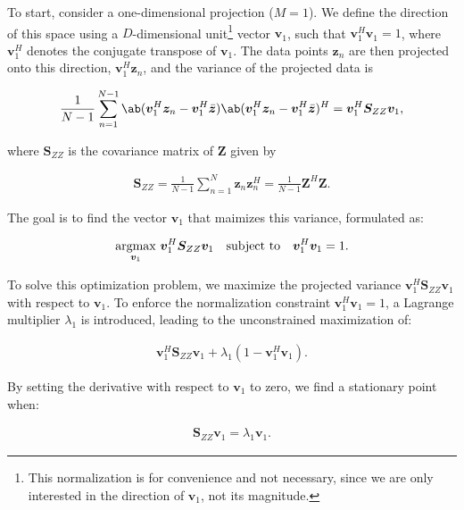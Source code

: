 To start, consider a one-dimensional projection ($M=1$). We define the direction of this space using a $D$-dimensional unit\footnote{This normalization is for convenience and not necessary, since we are only interested in the direction of $\bm{v}_1$, not its magnitude.} vector $\bm{v}_1$, such that $\bm{v}_1^H\bm{v}_1=1$, where $\bm{v}_1^H$ denotes the conjugate transpose of $\bm{v}_1$. The data points $\bm{z}_n$ are then projected onto this direction, $\bm{v}_1^H\bm{z}_n$, and the variance of the projected data is 

\begin{align}
    \frac{1}{N-1} \sum_{n=1}^{N-1} \ab( \bm{v}_1^H\bm{z}_n - \bm{v}_1^H\bar{\bm{z}} ) \ab( \bm{v}_1^H\bm{z}_n - \bm{v}_1^H\bar{\bm{z}} )^H = \bm{v}_1^H\bm{S}_{ZZ}\bm{v}_1,
\end{align}

where $\bm{S}_{ZZ}$ is the covariance matrix of $\bm{Z}$ given by

\begin{align}
    \bm{S}_{ZZ} = \frac{1}{N-1} \sum_{n=1}^{N} \bm{z}_n \bm{z}_n^H = \frac{1}{N-1} \bm{Z}^H \bm{Z}.
\end{align}

The goal is to find the vector $\bm{v}_1$ that maimizes this variance, formulated as:

\begin{align}\label{eq:theory:pca_maximization}
    \operatorname*{argmax}_{\bm{v}_1} \, \bm{v}_1^H\bm{S}_{ZZ}\bm{v}_1 \quad \text{subject to} \quad \bm{v}_1^H\bm{v}_1 = 1.
\end{align}

To solve this optimization problem, we maximize the projected variance $\bm{v}_1^H\bm{S}_{ZZ}\bm{v}_1$ with respect to $\bm{v}_1$. To enforce the normalization constraint $\bm{v}_1^H\bm{v}_1=1$, a Lagrange multiplier $\lambda_1$ is introduced, leading to the unconstrained maximization of: 

\begin{align}
    \bm{v}_1^H\bm{S}_{ZZ}\bm{v}_1 + \lambda_1(1-\bm{v}_1^H\bm{v}_1).
\end{align}

By setting the derivative with respect to $\bm{v}_1$ to zero, we find a stationary point when: 

\begin{align}\label{eq:theory:pca_eigenproblem}
    \bm{S}_{ZZ}\bm{v}_1 = \lambda_1\bm{v}_1.
\end{align}

